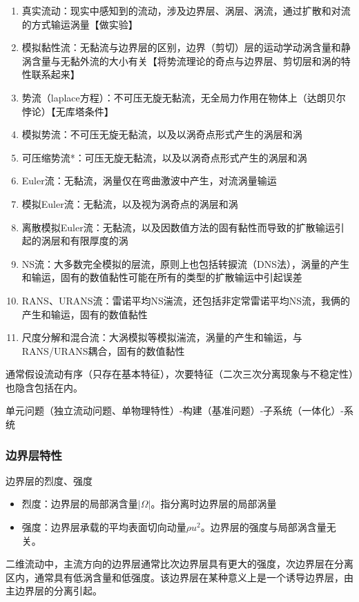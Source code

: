 \begin{enumerate}
    \item 真实流动：现实中感知到的流动，涉及边界层、涡层、涡流，通过扩散和对流的方式输运涡量【做实验】
    \item 模拟黏性流：无黏流与边界层的区别，边界（剪切）层的运动学动涡含量和静涡含量与无黏外流的大小有关【将势流理论的奇点与边界层、剪切层和涡的特性联系起来】
    \item 势流（laplace方程）：不可压无旋无黏流，无全局力作用在物体上（达朗贝尔悖论）【无库塔条件】
    \item 模拟势流：不可压无旋无黏流，以及以涡奇点形式产生的涡层和涡
    \item 可压缩势流*：可压无旋无黏流，以及以涡奇点形式产生的涡层和涡
    \item Euler流：无黏流，涡量仅在弯曲激波中产生，对流涡量输运
    \item 模拟Euler流：无黏流，以及视为涡奇点的涡层和涡
    \item 离散模拟Euler流：无黏流，以及因数值方法的固有黏性而导致的扩散输运引起的涡层和有限厚度的涡
    \item NS流：大多数完全模拟的层流，原则上也包括转捩流（DNS法），涡量的产生和输运，固有的数值黏性可能在所有的类型的扩散输运中引起误差
    \item RANS、URANS流：雷诺平均NS湍流，还包括非定常雷诺平均NS流，我俩的产生和输运，固有的数值黏性
    \item 尺度分解和混合流：大涡模拟等模拟湍流，涡量的产生和输运，与RANS/URANS耦合，固有的数值黏性
\end{enumerate}

通常假设流动有序（只存在基本特征），次要特征（二次三次分离现象与不稳定性）也隐含包括在内。

单元问题（独立流动问题、单物理特性）-构建（基准问题）-子系统（一体化）-系统

\subsubsection{边界层特性}
边界层的烈度、强度
\begin{itemize}
    \item 烈度：边界层的局部涡含量$|\Omega|$。指分离时边界层的局部涡量
    \item 强度：边界层承载的平均表面切向动量$\rho u^{2}$。边界层的强度与局部涡含量无关。
\end{itemize}
二维流动中，主流方向的边界层通常比次边界层具有更大的强度，次边界层在分离区内，通常具有低涡含量和低强度。该边界层在某种意义上是一个诱导边界层，由主边界层的分离引起。

